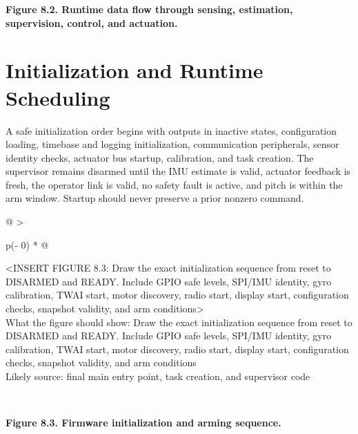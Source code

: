 \begin{center}\singlespacing
{}
\textbf{Figure 8.2. Runtime data flow through sensing, estimation, supervision, control, and actuation.}
\end{center}

\section{Initialization and Runtime Scheduling}\label{initialization-and-runtime-scheduling}

A safe initialization order begins with outputs in inactive states,
configuration loading, timebase and logging initialization,
communication peripherals, sensor identity checks, actuator bus startup,
calibration, and task creation. The supervisor remains disarmed until
the IMU estimate is valid, actuator feedback is fresh, the operator link
is valid, no safety fault is active, and pitch is within the arm window.
Startup should never preserve a prior nonzero command.

\begin{longtable}[]{@{}
  >{\raggedright\arraybackslash}p{(\columnwidth - 0\tabcolsep) * }@{}}
\toprule\noalign{}
\begin{minipage}[b]{\linewidth}\raggedright
\textless INSERT FIGURE 8.3: Draw the exact initialization sequence from
reset to DISARMED and READY. Include GPIO safe levels, SPI\slash{}IMU identity,
gyro calibration, TWAI start, motor discovery, radio start, display
start, configuration checks, snapshot validity, and arm
conditions\textgreater{}\\
What the figure should show: Draw the exact initialization sequence from
reset to DISARMED and READY. Include GPIO safe levels, SPI\slash{}IMU identity,
gyro calibration, TWAI start, motor discovery, radio start, display
start, configuration checks, snapshot validity, and arm conditions\\
Likely source: final main entry point, task creation, and supervisor
code\strut
\end{minipage} \\
\midrule\noalign{}
\endhead
\bottomrule\noalign{}
\endlastfoot
\end{longtable}

\begin{center}\singlespacing
{}
\textbf{Figure 8.3. Firmware initialization and arming sequence.}
\end{center}

